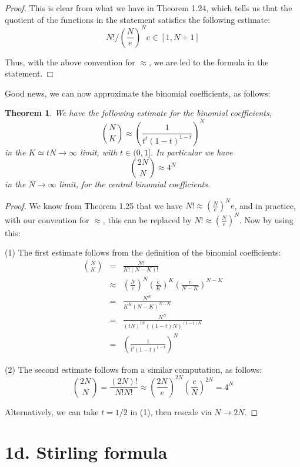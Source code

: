 \documentclass[12pt]{amsbook}
\newtheorem{theorem}{Theorem}[chapter]
\begin{document}
\begin{proof}
This is clear from what we have in Theorem 1.24, which tells us that the quotient of the functions in the statement satisfies the following estimate:
$$N!\Big/\left(\frac{N}{e}\right)^Ne\in[1,N+1]$$

Thus, with the above convention for $\approx$, we are led to the formula in the statement.
\end{proof}

Good news, we can now approximate the binomial coefficients, as follows:


\begin{theorem}
We have the following estimate for the binomial coefficients,
$$\binom{N}{K}\approx\left(\frac{1}{t^t(1-t)^{1-t}}\right)^N$$
in the $K\simeq tN\to\infty$ limit, with $t\in(0,1]$. In particular we have
$$\binom{2N}{N}\approx4^N$$
in the $N\to\infty$ limit, for the central binomial coefficients.
\end{theorem}

\begin{proof}
We know from Theorem 1.25 that we have $N!\approx \left(\frac{N}{e}\right)^Ne$, and in practice, with our convention for $\approx$, this can be replaced by $N!\approx \left(\frac{N}{e}\right)^N$. Now by using this:

\medskip

(1) The first estimate follows from the definition of the binomial coefficients:
\begin{eqnarray*}
\binom{N}{K}
&=&\frac{N!}{K!(N-K)!}\\
&\approx&\left(\frac{N}{e}\right)^N\left(\frac{e}{K}\right)^K\left(\frac{e}{N-K}\right)^{N-K}\\
&=&\frac{N^N}{K^K(N-K)^{N-K}}\\
&=&\frac{N^N}{(tN)^{tN}((1-t)N)^{(1-t)N}}\\
&=&\left(\frac{1}{t^t(1-t)^{1-t}}\right)^N
\end{eqnarray*}

(2) The second estimate follows from a similar computation, as follows:
$$\binom{2N}{N}
=\frac{(2N)!}{N!N!}
\approx\left(\frac{2N}{e}\right)^{2N}\left(\frac{e}{N}\right)^{2N}
=4^N$$

Alternatively, we can take $t=1/2$ in (1), then rescale via $N\to 2N$.
\end{proof}

\section*{1d. Stirling formula}
\end{document}
